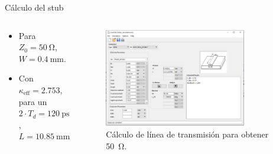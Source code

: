 \documentclass{beamer}
\begin{document}
\begin{frame}{Cálculo del stub}

    \begin{columns}[c]
        \begin{block}{}
            \begin{itemize}
                \item Para $Z_0 = \qty{50}{\ohm}$, $W =
                    \qty{0.4}{\milli\meter}$.
                \item Con $\kappa_{\text{eff}} = 2.753$, para un $2 \cdot T_d =
                    \qty{120}{\pico\second}$, $L = \qty{10.85}{\milli\meter}$
            \end{itemize}
        \end{block}
        \begin{figure}[tbp]
            \centering
            \includegraphics[width=0.8\textwidth]{images/tline_width_calculation.png}
            \caption{Cálculo de línea de transmisión para obtener \qty{50}{\ohm}.}
        \end{figure}
    \end{columns}
\end{frame}
\end{document}
